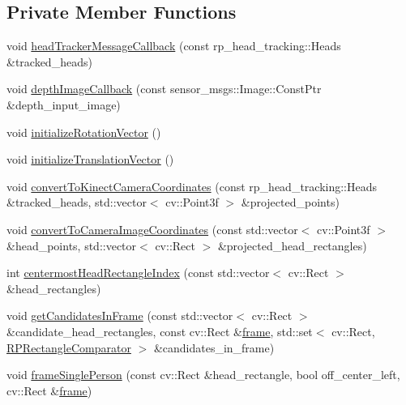 \subsection*{\-Private \-Member \-Functions}
\begin{DoxyCompactItemize}
\item 
void \hyperlink{class_r_p_framing_node_a0382670cfd83cd3002623e8969907ea7}{head\-Tracker\-Message\-Callback} (const rp\-\_\-head\-\_\-tracking\-::\-Heads \&tracked\-\_\-heads)
\item 
void \hyperlink{class_r_p_framing_node_a296105b2c174c8d616d6d05d889f22f9}{depth\-Image\-Callback} (const sensor\-\_\-msgs\-::\-Image\-::\-Const\-Ptr \&depth\-\_\-input\-\_\-image)
\item 
void \hyperlink{class_r_p_framing_node_ac5324e2882cac58d1bae6b82eb08a145}{initialize\-Rotation\-Vector} ()
\item 
void \hyperlink{class_r_p_framing_node_aa53b691c9287fc4435fc0ec4d3ac0127}{initialize\-Translation\-Vector} ()
\item 
void \hyperlink{class_r_p_framing_node_a8309f74244cb885c2538a33b10cc518d}{convert\-To\-Kinect\-Camera\-Coordinates} (const rp\-\_\-head\-\_\-tracking\-::\-Heads \&tracked\-\_\-heads, std\-::vector$<$ cv\-::\-Point3f $>$ \&projected\-\_\-points)
\item 
void \hyperlink{class_r_p_framing_node_a6d5f20f9074b914f657a038cd325272d}{convert\-To\-Camera\-Image\-Coordinates} (const std\-::vector$<$ cv\-::\-Point3f $>$ \&head\-\_\-points, std\-::vector$<$ cv\-::\-Rect $>$ \&projected\-\_\-head\-\_\-rectangles)
\item 
int \hyperlink{class_r_p_framing_node_aa2db07c46763d4b9e00ef82d56a11c5b}{centermost\-Head\-Rectangle\-Index} (const std\-::vector$<$ cv\-::\-Rect $>$ \&head\-\_\-rectangles)
\item 
void \hyperlink{class_r_p_framing_node_a978fc35a57bcab9aa873756d27a6c54a}{get\-Candidates\-In\-Frame} (const std\-::vector$<$ cv\-::\-Rect $>$ \&candidate\-\_\-head\-\_\-rectangles, const cv\-::\-Rect \&\hyperlink{class_r_p_framing_node_a1e4cba34d01b81db86ae54435d98ec76}{frame}, std\-::set$<$ cv\-::\-Rect, \hyperlink{struct_r_p_framing_node_1_1_r_p_rectangle_comparator}{\-R\-P\-Rectangle\-Comparator} $>$ \&candidates\-\_\-in\-\_\-frame)
\item 
void \hyperlink{class_r_p_framing_node_a7d7448265127cd1082f124a2bbd7e7e7}{frame\-Single\-Person} (const cv\-::\-Rect \&head\-\_\-rectangle, bool off\-\_\-center\-\_\-left, cv\-::\-Rect \&\hyperlink{class_r_p_framing_node_a1e4cba34d01b81db86ae54435d98ec76}{frame})

\end{DoxyCompactItemize}
